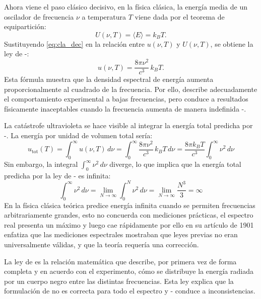 \documentclass[11pt,a4paper,spanish]{book}
\begin{document}
Ahora viene el paso clásico decisivo, en la física clásica, la
energía media de un oscilador de frecuencia
$\nu$ a temperatura $T$ viene dada por el teorema de equipartición:
\begin{equation}
  U(\nu,T)=\langle E\rangle = k_{B}T.
  \label{eq:cla_dec}
\end{equation}
Sustituyendo \eqref{eq:cla_dec} en la relación entre $u(\nu,T)$ y
$U(\nu,T)$, se obtiene la ley de \cite{rayleigh1900}-\cite{jeans1905}:
\begin{equation}
  u(\nu,T)=\frac{8\pi\nu^{2}}{c^{3}}\,k_{B}T.
  \label{eq:rayleigh_jeans_u_nu}
\end{equation}
Esta fórmula muestra que la densidad espectral de energía aumenta
proporcionalmente
al cuadrado de la frecuencia. Por ello, describe adecuadamente el
comportamiento experimental
a bajas frecuencias, pero conduce a resultados físicamente
inaceptables cuando la frecuencia
aumenta de manera indefinida \cite{rayleigh1900}-\cite{jeans1905}.

La catástrofe ultravioleta se hace visible al integrar la energía
total predicha por \cite{rayleigh1900}-\cite{jeans1905}. La energía
por unidad de volumen total sería:
\begin{equation}
  u_{\text{tot}}(T) = \int_{0}^{\infty} u(\nu,T)\,d\nu =
  \int_{0}^{\infty}\frac{8\pi\nu^{2}}{c^{3}}\,k_{B}T\,d\nu =
  \frac{8\pi k_{B}T}{c^{3}}\int_{0}^{\infty}\nu^{2}\,d\nu
\end{equation}
Sin embargo, la integral \(\int_{0}^{\infty}\nu^{2}\,d\nu\) diverge,
lo que implica que la energía total predicha por la ley de
\cite{rayleigh1900}-\cite{jeans1905} es infinita:
\begin{equation}
  \int_{0}^{\infty}\nu^{2}\,d\nu =
  \lim_{N\to\infty}\int_{0}^{N}\nu^{2}\,d\nu =
  \lim_{N\to\infty}\frac{N^{3}}{3} = \infty
\end{equation}
En la física clásica teórica predice energía infinita cuando se
permiten frecuencias arbitrariamente grandes, esto no concuerda con
mediciones prácticas, el espectro real presenta un máximo y luego cae
rápidamente por ello \cite{planck1901} en su artículo de 1901 enfatiza que las
mediciones espectrales mostraban que leyes previas no eran
universalmente válidas, y que la teoría requería una
corrección.

La ley de \cite{planck1900} es la relación matemática que describe,
por primera vez de forma completa y en acuerdo con el experimento,
cómo se distribuye la energía radiada por un cuerpo negro entre las
distintas frecuencias. Esta ley explica que la formulación de
\cite{wien1893} no es
correcta para todo el espectro y \cite{rayleigh1900}-\cite{jeans1905}
conduce a inconsistencias.
\end{document}
